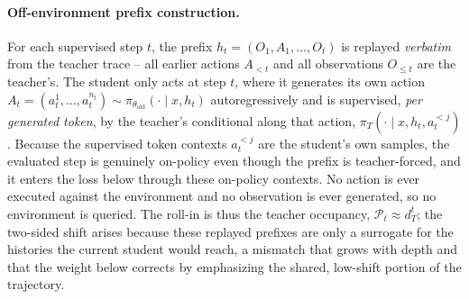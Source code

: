 \paragraph{Off-environment prefix construction.}
For each supervised step \(t\), the prefix \(h_t=(O_1,A_1,\dots,O_t)\) is replayed
\emph{verbatim} from the teacher trace -- all earlier actions \(A_{<t}\) and all
observations \(O_{\le t}\) are the teacher's. The student only acts at step \(t\),
where it generates its own action
\(A_t=(a_t^1,\dots,a_t^{n_t})\sim\pi_{\theta_{\mathrm{old}}}(\cdot\mid x,h_t)\)
autoregressively and is supervised, \emph{per generated token}, by the teacher's
conditional along that action, \(\pi_T(\cdot\mid x,h_t,a_t^{<j})\). Because the
supervised token contexts \(a_t^{<j}\) are the student's own samples, the evaluated
step is genuinely on-policy even though the prefix is teacher-forced, and it enters the
loss below through these on-policy contexts. No action is ever executed against the
environment and no observation is ever generated, so no environment is queried. The
roll-in is thus the teacher occupancy, \(\mathcal P_t\approx d_T^{t}\); the two-sided
shift arises because these replayed prefixes are only a surrogate for the histories the
current student would reach, a mismatch that grows with depth and that the weight below
corrects by emphasizing the shared, low-shift portion of the trajectory.

